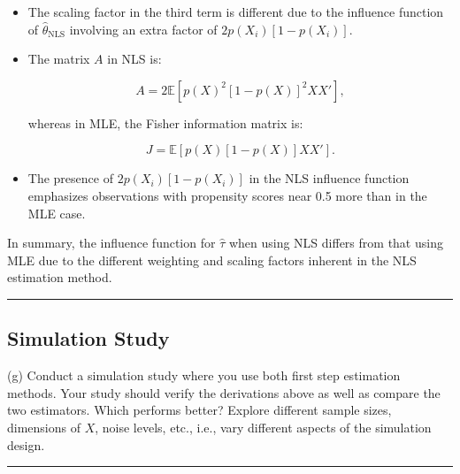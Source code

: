 \documentclass{article}
\newenvironment{colorparagraph}[1]{\par\color{#1}}{\par}
\begin{document}
\begin{itemize}
    \item The scaling factor in the third term is different due to the influence function of \( \hat{\theta}_{\text{NLS}} \) involving an extra factor of \( 2 p(X_i) [1 - p(X_i)] \).
    \item The matrix \( A \) in NLS is:

    \[
    A = 2 \mathbb{E}\left[ p(X)^2 [1 - p(X)]^2 X X' \right],
    \]

    whereas in MLE, the Fisher information matrix is:

    \[
    J = \mathbb{E}\left[ p(X) [1 - p(X)] X X' \right].
    \]

    \item The presence of \( 2 p(X_i) [1 - p(X_i)] \) in the NLS influence function emphasizes observations with propensity scores near 0.5 more than in the MLE case.
\end{itemize}

In summary, the influence function for \( \hat{\tau} \) when using NLS differs from that using MLE due to the different weighting and scaling factors inherent in the NLS estimation method.

\begin{colorparagraph}{questioncolor}
\label{q1g}
\rule{\textwidth}{0.5pt}
\subsection{Simulation Study}
(g) Conduct a simulation study where you use both first step estimation methods.
Your study should verify the derivations above as well as compare the two estimators.
Which performs better?
Explore different sample sizes, dimensions of \( X \), noise levels, etc., i.e., vary different aspects of the simulation design.

\rule{\textwidth}{0.5pt}
\end{colorparagraph}
\end{document}
